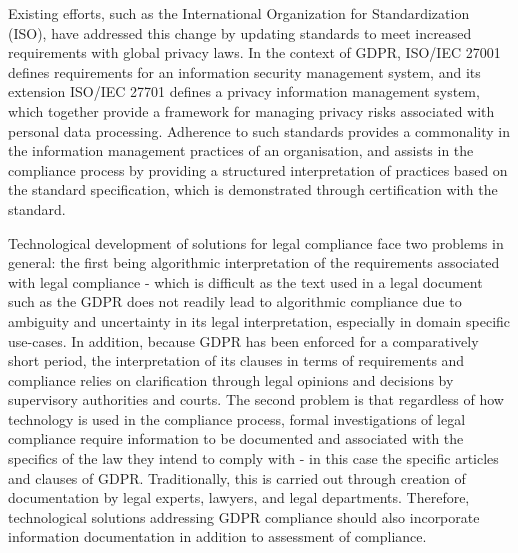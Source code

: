 Existing efforts, such as the International Organization for Standardization (ISO), have addressed this change by updating standards to meet increased requirements with global privacy laws.
In the context of GDPR, ISO/IEC 27001 defines requirements for an information security management system, and its extension ISO/IEC 27701 defines a privacy information management system, which together provide a framework for managing privacy risks associated with personal data processing.
Adherence to such standards provides a commonality in the information management practices of an organisation, and assists in the compliance process by providing a structured interpretation of practices based on the standard specification, which is demonstrated through certification with the standard.

Technological development of solutions for legal compliance face two problems in general: the first being algorithmic interpretation of the requirements associated with legal compliance - which is difficult as the text used in a legal document such as the GDPR does not readily lead to algorithmic compliance due to ambiguity and uncertainty in its legal interpretation, especially in domain specific use-cases.
In addition, because GDPR has been enforced for a comparatively short period, the interpretation of its clauses in terms of requirements and compliance relies on clarification through legal opinions and decisions by supervisory authorities and courts.
The second problem is that regardless of how technology is used in the compliance process, formal investigations of legal compliance require information to be documented and associated with the specifics of the law they intend to comply with - in this case the specific articles and clauses of GDPR.
Traditionally, this is carried out through creation of documentation by legal experts, lawyers, and legal departments.
Therefore, technological solutions addressing GDPR compliance should also incorporate information documentation in addition to assessment of compliance. 


